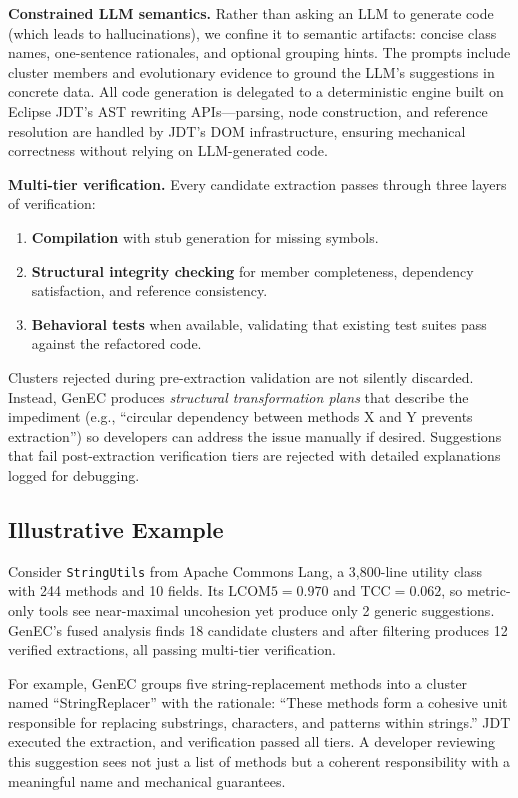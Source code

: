 \documentclass[sigconf]{acmart}
\begin{document}
\textbf{Constrained LLM semantics.}  Rather than asking an LLM to generate code
(which leads to hallucinations), we confine it to semantic artifacts: concise
class names, one-sentence rationales, and optional grouping hints. The prompts
include cluster members and evolutionary evidence to ground the LLM's
suggestions in concrete data. All code generation is delegated to a deterministic engine built on Eclipse JDT's AST rewriting APIs---parsing, node construction, and reference resolution are handled by JDT's DOM infrastructure, ensuring mechanical correctness without relying on LLM-generated code.

\textbf{Multi-tier verification.}  Every candidate extraction passes through
three layers of verification:
\begin{enumerate}
  \item \textbf{Compilation} with stub generation for missing symbols.
  \item \textbf{Structural integrity checking} for member completeness,
        dependency satisfaction, and reference consistency.
  \item \textbf{Behavioral tests} when available, validating that existing test suites pass against the refactored code.
\end{enumerate}
Clusters rejected during pre-extraction validation are not silently discarded. Instead, GenEC
produces \emph{structural transformation plans} that describe the impediment
(e.g., ``circular dependency between methods X and Y prevents extraction'') so
developers can address the issue manually if desired. Suggestions that fail post-extraction verification tiers are rejected with detailed explanations logged for debugging.

\subsection{Illustrative Example}
\label{sec:illustrative}

Consider \texttt{StringUtils} from Apache Commons Lang, a 3,800-line utility
class with 244 methods and 10 fields. Its $\text{LCOM5}=0.970$ and
$\text{TCC}=0.062$, so metric-only tools see near-maximal uncohesion yet
produce only 2 generic suggestions. GenEC's fused analysis finds 18 candidate
clusters and after filtering produces 12 verified extractions, all passing
multi-tier verification.

For example, GenEC groups five string-replacement methods into a cluster named
``StringReplacer'' with the rationale: ``These methods form a cohesive unit
responsible for replacing substrings, characters, and patterns within
strings.''  JDT executed the extraction, and verification passed all tiers. A
developer reviewing this suggestion sees not just a list of methods but a
coherent responsibility with a meaningful name and mechanical guarantees.
\end{document}
